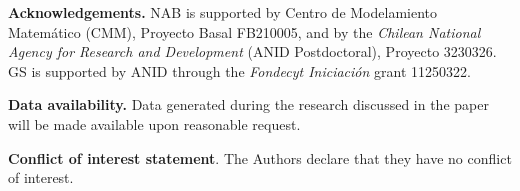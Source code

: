 \documentclass[10pt,a4paper]{article}
\begin{document}
\noindent
{\bf Acknowledgements.} NAB is supported by Centro de Modelamiento Matemático (CMM), Proyecto Basal FB210005, and by the \textit{Chilean National Agency for Research and Development} (ANID Postdoctoral), Proyecto 3230326. GS is supported by ANID through the \textit{Fondecyt Iniciación} grant 11250322.
\par\smallskip
\noindent
{\bf Data availability.} Data generated during the research discussed in the paper will be made available upon reasonable request.
\par\smallskip
\noindent
{\bf Conflict of interest statement}.  The Authors declare that they have no conflict of interest.

  

\end{document}
